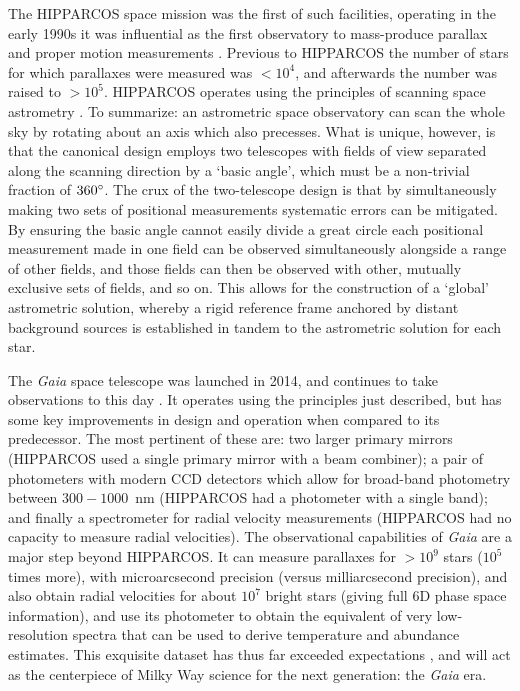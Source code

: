 The HIPPARCOS space mission was the first of such facilities, operating in the early 1990s it was influential as the first observatory to mass-produce parallax and proper motion measurements \parencite{hipparcos}. Previous to HIPPARCOS the number of stars for which parallaxes were measured was $< 10^{4}$, and afterwards the number was raised to $> 10^{5}$. HIPPARCOS operates using the principles of scanning space astrometry \parencite[see][]{lindegren10}. To summarize: an astrometric space observatory can scan the whole sky by rotating about an axis which also precesses. What is unique, however, is that the canonical design employs two telescopes with fields of view separated along the scanning direction by a `basic angle', which must be a non-trivial fraction of $360\hbox{$^\circ$}$. The crux of the two-telescope design is that by simultaneously making two sets of positional measurements systematic errors can be mitigated. By ensuring the basic angle cannot easily divide a great circle each positional measurement made in one field can be observed simultaneously alongside a range of other fields, and those fields can then be observed with other, mutually exclusive sets of fields, and so on. This allows for the construction of a `global' astrometric solution, whereby a rigid reference frame anchored by distant background sources is established in tandem to the astrometric solution for each star.

The \textit{Gaia} space telescope was launched in 2014, and continues to take observations to this day \parencite[see][ for design specifications and related references]{gaia}. It operates using the principles just described, but has some key improvements in design and operation when compared to its predecessor. The most pertinent of these are: two larger primary mirrors (HIPPARCOS used a single primary mirror with a beam combiner); a pair of photometers with modern CCD detectors which allow for broad-band photometry between $300-1000$~nm (HIPPARCOS had a photometer with a single band); and finally a spectrometer for radial velocity measurements (HIPPARCOS had no capacity to measure radial velocities). The observational capabilities of \textit{Gaia} are a major step beyond HIPPARCOS. It can measure parallaxes for $> 10^{9}$ stars ($10^{5}$ times more), with microarcsecond precision (versus milliarcsecond precision), and also obtain radial velocities for about $10^{7}$ bright stars (giving full 6D phase space information), and use its photometer to obtain the equivalent of very low-resolution spectra that can be used to derive temperature and abundance estimates. This exquisite dataset has thus far exceeded expectations \parencite[e.g. see a commentary and review by][shortly after the second data release]{brown21}, and will act as the centerpiece of Milky Way science for the next generation: the \textit{Gaia} era.

